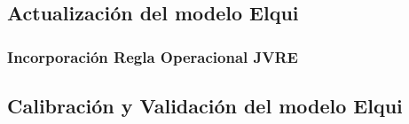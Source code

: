 \documentclass[11pt,]{article}
\begin{document}
	
		\subsection{Actualización del modelo Elqui}\bigskip
		
			\subsubsection{Incorporación Regla Operacional JVRE}\bigskip
			
		\subsection{Calibración y Validación del modelo Elqui}
		
\end{document}

